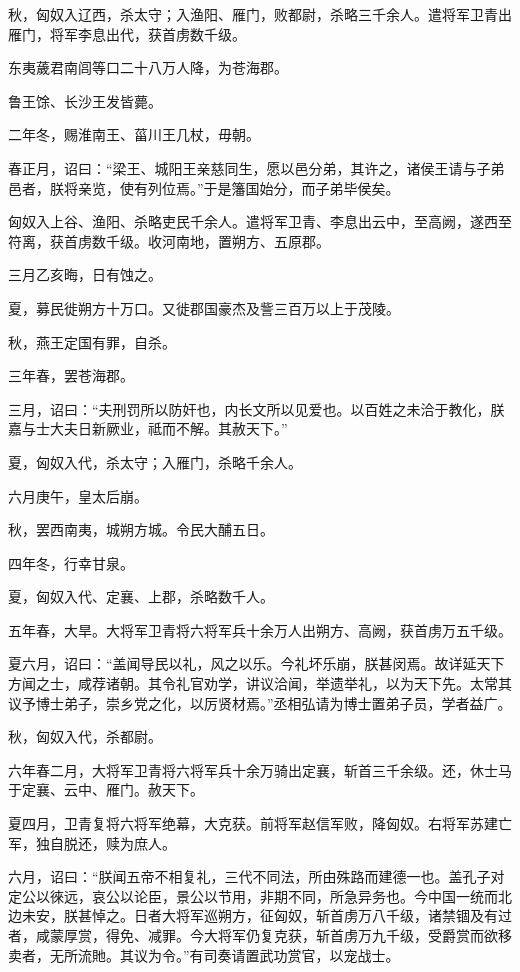 \documentclass[]{article}
\begin{document}
秋，匈奴入辽西，杀太守；入渔阳、雁门，败都尉，杀略三千余人。遣将军卫青出雁门，将军李息出代，获首虏数千级。

东夷薉君南闾等口二十八万人降，为苍海郡。

鲁王馀、长沙王发皆薨。

二年冬，赐淮南王、菑川王几杖，毋朝。

春正月，诏曰：``梁王、城阳王亲慈同生，愿以邑分弟，其许之，诸侯王请与子弟邑者，朕将亲览，使有列位焉。''于是籓国始分，而子弟毕侯矣。

匈奴入上谷、渔阳、杀略吏民千余人。遣将军卫青、李息出云中，至高阙，遂西至符离，获首虏数千级。收河南地，置朔方、五原郡。

三月乙亥晦，日有蚀之。

夏，募民徙朔方十万口。又徙郡国豪杰及訾三百万以上于茂陵。

秋，燕王定国有罪，自杀。

三年春，罢苍海郡。

三月，诏曰：``夫刑罚所以防奸也，内长文所以见爱也。以百姓之未洽于教化，朕嘉与士大夫日新厥业，祗而不解。其赦天下。''

夏，匈奴入代，杀太守；入雁门，杀略千余人。

六月庚午，皇太后崩。

秋，罢西南夷，城朔方城。令民大酺五日。

四年冬，行幸甘泉。

夏，匈奴入代、定襄、上郡，杀略数千人。

五年春，大旱。大将军卫青将六将军兵十余万人出朔方、高阙，获首虏万五千级。

夏六月，诏曰：``盖闻导民以礼，风之以乐。今礼坏乐崩，朕甚闵焉。故详延天下方闻之士，咸荐诸朝。其令礼官劝学，讲议洽闻，举遗举礼，以为天下先。太常其议予博士弟子，崇乡党之化，以厉贤材焉。''丞相弘请为博士置弟子员，学者益广。

秋，匈奴入代，杀都尉。

六年春二月，大将军卫青将六将军兵十余万骑出定襄，斩首三千余级。还，休士马于定襄、云中、雁门。赦天下。

夏四月，卫青复将六将军绝幕，大克获。前将军赵信军败，降匈奴。右将军苏建亡军，独自脱还，赎为庶人。

六月，诏曰：``朕闻五帝不相复礼，三代不同法，所由殊路而建德一也。盖孔子对定公以徠远，哀公以论臣，景公以节用，非期不同，所急异务也。今中国一统而北边未安，朕甚悼之。日者大将军巡朔方，征匈奴，斩首虏万八千级，诸禁锢及有过者，咸蒙厚赏，得免、减罪。今大将军仍复克获，斩首虏万九千级，受爵赏而欲移卖者，无所流貤。其议为令。''有司奏请置武功赏官，以宠战士。
\end{document}
